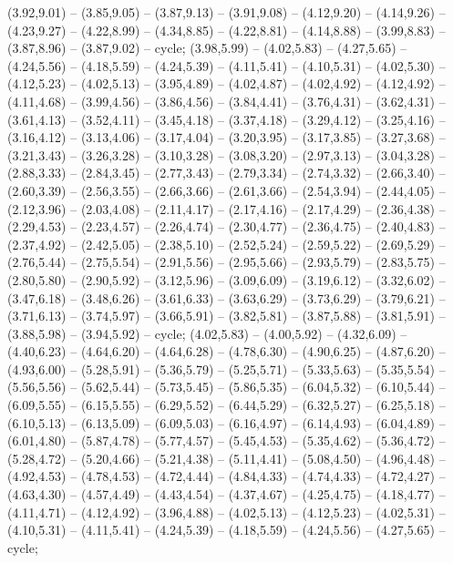 { (3.92,9.01) -- (3.85,9.05) -- (3.87,9.13) -- (3.91,9.08) -- (4.12,9.20) -- (4.14,9.26) -- (4.23,9.27) -- (4.22,8.99) -- (4.34,8.85) -- (4.22,8.81) -- (4.14,8.88) -- (3.99,8.83) -- (3.87,8.96) -- (3.87,9.02) -- cycle;
 (3.98,5.99) -- (4.02,5.83) -- (4.27,5.65) -- (4.24,5.56) -- (4.18,5.59) -- (4.24,5.39) -- (4.11,5.41) -- (4.10,5.31) -- (4.02,5.30) -- (4.12,5.23) -- (4.02,5.13) -- (3.95,4.89) -- (4.02,4.87) -- (4.02,4.92) -- (4.12,4.92) -- (4.11,4.68) -- (3.99,4.56) -- (3.86,4.56) -- (3.84,4.41) -- (3.76,4.31) -- (3.62,4.31) -- (3.61,4.13) -- (3.52,4.11) -- (3.45,4.18) -- (3.37,4.18) -- (3.29,4.12) -- (3.25,4.16) -- (3.16,4.12) -- (3.13,4.06) -- (3.17,4.04) -- (3.20,3.95) -- (3.17,3.85) -- (3.27,3.68) -- (3.21,3.43) -- (3.26,3.28) -- (3.10,3.28) -- (3.08,3.20) -- (2.97,3.13) -- (3.04,3.28) -- (2.88,3.33) -- (2.84,3.45) -- (2.77,3.43) -- (2.79,3.34) -- (2.74,3.32) -- (2.66,3.40) -- (2.60,3.39) -- (2.56,3.55) -- (2.66,3.66) -- (2.61,3.66) -- (2.54,3.94) -- (2.44,4.05) -- (2.12,3.96) -- (2.03,4.08) -- (2.11,4.17) -- (2.17,4.16) -- (2.17,4.29) -- (2.36,4.38) -- (2.29,4.53) -- (2.23,4.57) -- (2.26,4.74) -- (2.30,4.77) -- (2.36,4.75) -- (2.40,4.83) -- (2.37,4.92) -- (2.42,5.05) -- (2.38,5.10) -- (2.52,5.24) -- (2.59,5.22) -- (2.69,5.29) -- (2.76,5.44) -- (2.75,5.54) -- (2.91,5.56) -- (2.95,5.66) -- (2.93,5.79) -- (2.83,5.75) -- (2.80,5.80) -- (2.90,5.92) -- (3.12,5.96) -- (3.09,6.09) -- (3.19,6.12) -- (3.32,6.02) -- (3.47,6.18) -- (3.48,6.26) -- (3.61,6.33) -- (3.63,6.29) -- (3.73,6.29) -- (3.79,6.21) -- (3.71,6.13) -- (3.74,5.97) -- (3.66,5.91) -- (3.82,5.81) -- (3.87,5.88) -- (3.81,5.91) -- (3.88,5.98) -- (3.94,5.92) -- cycle;
 (4.02,5.83) -- (4.00,5.92) -- (4.32,6.09) -- (4.40,6.23) -- (4.64,6.20) -- (4.64,6.28) -- (4.78,6.30) -- (4.90,6.25) -- (4.87,6.20) -- (4.93,6.00) -- (5.28,5.91) -- (5.36,5.79) -- (5.25,5.71) -- (5.33,5.63) -- (5.35,5.54) -- (5.56,5.56) -- (5.62,5.44) -- (5.73,5.45) -- (5.86,5.35) -- (6.04,5.32) -- (6.10,5.44) -- (6.09,5.55) -- (6.15,5.55) -- (6.29,5.52) -- (6.44,5.29) -- (6.32,5.27) -- (6.25,5.18) -- (6.10,5.13) -- (6.13,5.09) -- (6.09,5.03) -- (6.16,4.97) -- (6.14,4.93) -- (6.04,4.89) -- (6.01,4.80) -- (5.87,4.78) -- (5.77,4.57) -- (5.45,4.53) -- (5.35,4.62) -- (5.36,4.72) -- (5.28,4.72) -- (5.20,4.66) -- (5.21,4.38) -- (5.11,4.41) -- (5.08,4.50) -- (4.96,4.48) -- (4.92,4.53) -- (4.78,4.53) -- (4.72,4.44) -- (4.84,4.33) -- (4.74,4.33) -- (4.72,4.27) -- (4.63,4.30) -- (4.57,4.49) -- (4.43,4.54) -- (4.37,4.67) -- (4.25,4.75) -- (4.18,4.77) -- (4.11,4.71) -- (4.12,4.92) -- (3.96,4.88) -- (4.02,5.13) -- (4.12,5.23) -- (4.02,5.31) -- (4.10,5.31) -- (4.11,5.41) -- (4.24,5.39) -- (4.18,5.59) -- (4.24,5.56) -- (4.27,5.65) -- cycle;
}
